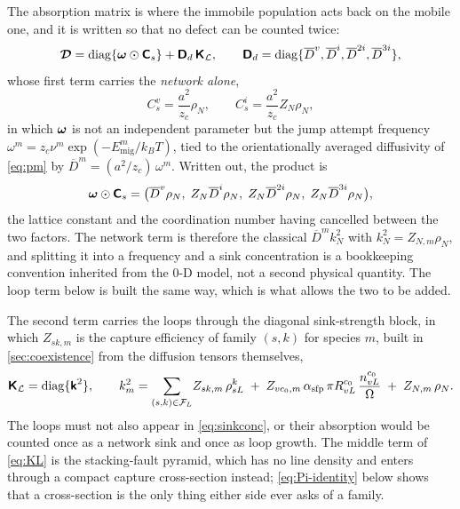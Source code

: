 The absorption matrix is where the immobile population acts back on the mobile
one, and it is written so that no defect can be counted twice:
\begin{equation}
  \bm{\mathcal{D}} = \mathrm{diag}\{\bm{\mathsf{\omega}}\odot\bm{\mathsf{C}}_s\}
             + \bm{\mathsf{D}}_d\,\bm{\mathsf{K}}_{\mathcal L},
  \qquad
  \bm{\mathsf{D}}_d=\mathrm{diag}\{\overline D^{v},\overline D^{i},
                            \overline D^{2i},\overline D^{3i}\},
  \label{eq:KM}
\end{equation}
whose first term carries the \emph{network alone},
\begin{equation}
  C_s^{v}=\frac{a^2}{z_c}\rho_N,
  \qquad
  C_s^{i}=\frac{a^2}{z_c}Z_N\rho_N,
  \label{eq:sinkconc}
\end{equation}
in which $\bm{\mathsf{\omega}}$ is not an independent parameter but the jump attempt
frequency $\omega^{m}=z_c\nu^{m}\exp(-E^{m}_{\mathrm{mig}}/k_BT)$, tied to the
orientationally averaged diffusivity of \cref{eq:pm} by
$\overline D^{m}=(a^{2}/z_c)\,\omega^{m}$. Written out, the product is
\[
  \bm{\mathsf{\omega}}\odot\bm{\mathsf{C}}_s
  =\bigl(\overline D^{v}\rho_N,\;
          Z_N\overline D^{i}\rho_N,\;
          Z_N\overline D^{2i}\rho_N,\;
          Z_N\overline D^{3i}\rho_N\bigr),
\]
the lattice constant and the coordination number having cancelled between the
two factors. The network term is therefore the classical $\overline D^{m}k^{2}_N$
with $k^{2}_N=Z_{N,m}\rho_N$, and splitting it into a frequency and a sink
concentration is a bookkeeping convention inherited from the $0$-D model, not a
second physical quantity. The loop term below is built the same way, which is
what allows the two to be added.

The second term carries the loops through the diagonal sink-strength block,
in which $Z_{sk,m}$ is the capture efficiency of family $(s,k)$ for species $m$,
built in \cref{sec:coexistence} from the diffusion tensors themselves,
\begin{equation}
  \bm{\mathsf{K}}_{\mathcal L}=\mathrm{diag}\{\bm{\mathsf{k}}^{2}\},
  \qquad
  k_m^{2}=\sum_{(s,k)\in\mathcal F_L}\! Z_{sk,m}\,\rho^k_{sL}
        \;+\;Z_{vc_0,m}\,\alpha_{\mathrm{sfp}}\,\pi R^{c_0}_{vL}\,
             \frac{n^{c_0}_{vL}}{\Omega}
        \;+\;Z_{N,m}\,\rho_N .
  \label{eq:KL}
\end{equation}
The loops must not also appear in \cref{eq:sinkconc}, or their absorption would
be counted once as a network sink and once as loop growth. The middle term of
\cref{eq:KL} is the stacking-fault pyramid, which has no line density and enters
through a compact capture cross-section instead; \cref{eq:Pi-identity} below
shows that a cross-section is the only thing either side ever asks of a family.

